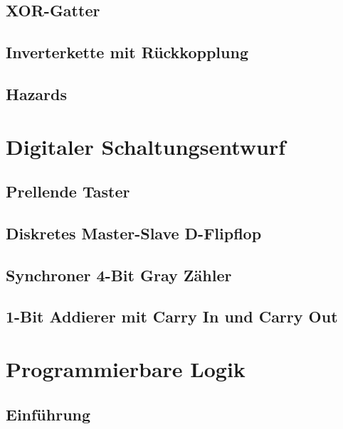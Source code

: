 \documentclass[paper=a4, fontsize=11pt]{scrartcl}
\numberwithin{equation}{section}
\numberwithin{figure}{section}
\numberwithin{table}{section}
\begin{document}
\subsection{XOR-Gatter}

\subsection{Inverterkette mit Rückkopplung}

\subsection{Hazards}


\newpage

\section{Digitaler Schaltungsentwurf}

\subsection{Prellende Taster}

\subsection{Diskretes Master-Slave D-Flipflop}

\subsection{Synchroner 4-Bit Gray Zähler}

\subsection{1-Bit Addierer mit Carry In und Carry Out}


\newpage

\section{Programmierbare Logik}

\subsection{Einführung}
\end{document}

